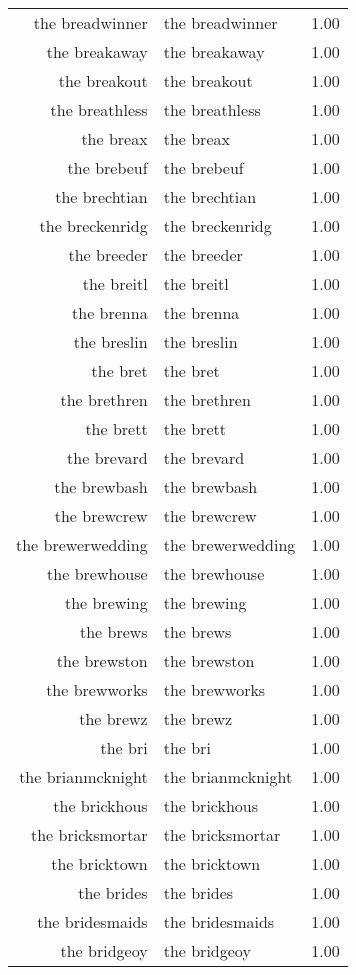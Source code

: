 \begin{table}[ht]
\begin{tabular}{rlr}
  the breadwinner & the breadwinner & 1.00 \\ 
  the breakaway & the breakaway & 1.00 \\ 
  the breakout & the breakout & 1.00 \\ 
  the breathless & the breathless & 1.00 \\ 
  the breax & the breax & 1.00 \\ 
  the brebeuf & the brebeuf & 1.00 \\ 
  the brechtian & the brechtian & 1.00 \\ 
  the breckenridg & the breckenridg & 1.00 \\ 
  the breeder & the breeder & 1.00 \\ 
  the breitl & the breitl & 1.00 \\ 
  the brenna & the brenna & 1.00 \\ 
  the breslin & the breslin & 1.00 \\ 
  the bret & the bret & 1.00 \\ 
  the brethren & the brethren & 1.00 \\ 
  the brett & the brett & 1.00 \\ 
  the brevard & the brevard & 1.00 \\ 
  the brewbash & the brewbash & 1.00 \\ 
  the brewcrew & the brewcrew & 1.00 \\ 
  the brewerwedding & the brewerwedding & 1.00 \\ 
  the brewhouse & the brewhouse & 1.00 \\ 
  the brewing & the brewing & 1.00 \\ 
  the brews & the brews & 1.00 \\ 
  the brewston & the brewston & 1.00 \\ 
  the brewworks & the brewworks & 1.00 \\ 
  the brewz & the brewz & 1.00 \\ 
  the bri & the bri & 1.00 \\ 
  the brianmcknight & the brianmcknight & 1.00 \\ 
  the brickhous & the brickhous & 1.00 \\ 
  the bricksmortar & the bricksmortar & 1.00 \\ 
  the bricktown & the bricktown & 1.00 \\ 
  the brides & the brides & 1.00 \\ 
  the bridesmaids & the bridesmaids & 1.00 \\ 
  the bridgeoy & the bridgeoy & 1.00 \\ 

\end{tabular}
\end{table}
